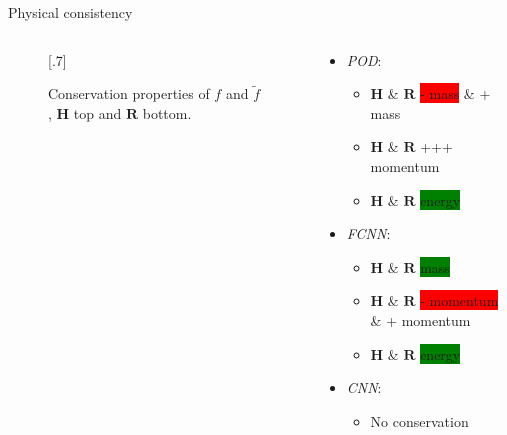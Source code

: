 \documentclass[usenames,dvipsnames,Nike,mathserif]{tuberlinbeamer}
\begin{document}
\begin{frame}[fragile]{Physical consistency}
		\begin{columns}
			\begin{column}{.61\textwidth}
				\begin{figure}
					\scalebox{.7}[.7]{}
					\caption{
						Conservation properties of $f$ and $\tilde{f}$, $\mathbf{H}$ top and $\mathbf{R}$ bottom.}
				\end{figure}
			\end{column}
		\begin{column}{.39\textwidth}
			\begin{itemize}
				\item<2->\emph{POD}:
				\begin{itemize}
					\item $\mathbf{H}$ \& $\mathbf{R}$ \colorbox{red}{- mass} 
					\& \colorbox{ProcessBlue}{+ mass}
					\item $\mathbf{H}$ \& $\mathbf{R}$ \colorbox{ProcessBlue}{+++ momentum}
					\item $\mathbf{H}$ \& $\mathbf{R}$ \colorbox{green}{energy} 
				\end{itemize}
				\item<3->\emph{FCNN}:
				\begin{itemize}
					\item $\mathbf{H}$ \& $\mathbf{R}$ \colorbox{green}{mass} 
					\item $\mathbf{H}$ \& $\mathbf{R}$ \colorbox{red}{- momentum} 
					\& \colorbox{ProcessBlue}{+ momentum}
					\item $\mathbf{H}$ \& $\mathbf{R}$ \colorbox{green}{energy} 
				\end{itemize}
				\item<4->\emph{CNN}:
				\begin{itemize}
					\item No conservation
				\end{itemize}
			\end{itemize}
		\end{column}
	\end{columns}
\end{frame}
\end{document}
